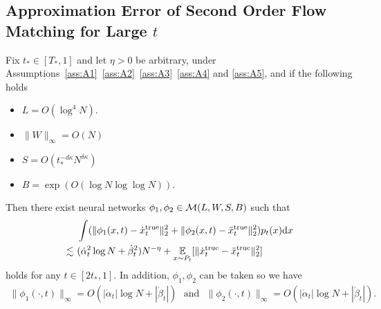 \subsection{Approximation Error of Second Order Flow Matching for Large \texorpdfstring{$t$}{}}
\begin{theorem}\label{thm:secon_order_large_t:formal}
    Fix $t_{*} \in [T_{*},1]$ and let $\eta>0$ be arbitrary, under Assumptions~\ref{ass:A1}~\ref{ass:A2}~\ref{ass:A3}~\ref{ass:A4} and \ref{ass:A5}, and if the following holds 
    \begin{itemize}
        \item $L = O(\log^4 N )$.
        \item $\|W\|_{\infty} = O(N)$
        \item $S = O(t_{*}^{- d\kappa} N^{\delta\kappa})$
        \item $B = \exp(O (\log N \log \log N ) ).$
    \end{itemize}
  Then there exist neural networks $\phi_{1},\phi_2  \in  {\cal M}(L,W,S,B)$ such that
\begin{align*}
    &~ \int (\|\phi_1(x, t) - \dot{x}_t^\mathrm{true}\|_2^2 + \|\phi_2(x, t) - \ddot{x}_t^\mathrm{true}\|_2^2) p_t(x) \mathrm{d} x \\ \lesssim &~ (\dot{\alpha}_t^{2} \log N  +   \dot{\beta}_t^{2} ) N^{-\eta} +
    \operatorname*{{\mathbb{E}}}_{x \sim P_t}[\|\dot{x}^\mathrm{true}_t - \ddot{x}^\mathrm{true}_t\|_2^2]
\end{align*}
    holds for any $t \in [2t_*, 1]$. In addition, $\phi_1, \phi_2$ can be taken so we have
    \begin{align*}
         \|\phi_1(\cdot,t) \|_\infty = O(  |\dot{\alpha}_t | \log N +  |\dot{\beta}_t |) \mathrm{~~~and~~~} \|\phi_2(\cdot,t) \|_\infty = O(  |\dot{\alpha}_t | \log N +  |\dot{\beta}_t |).
    \end{align*}
\end{theorem}
